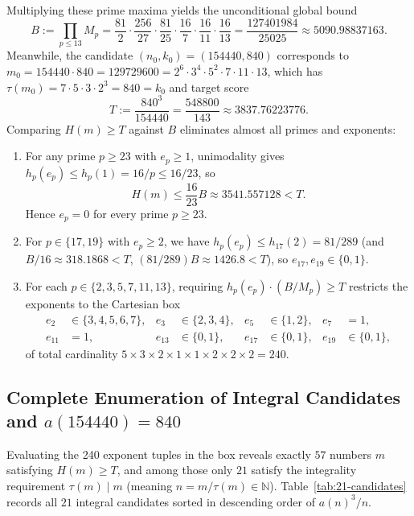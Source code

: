 \documentclass[11pt,a4paper]{article}
\theoremstyle{definition}
\theoremstyle{remark}
\newcommand{\N}{\mathbb{N}}
\begin{document}
Multiplying these prime maxima yields the unconditional global bound
\[
  B := \prod_{p \le 13} M_p = \frac{81}{2}\cdot\frac{256}{27}\cdot\frac{81}{25}\cdot\frac{16}{7}\cdot\frac{16}{11}\cdot\frac{16}{13} = \frac{127401984}{25025} \approx 5090.98837163.
\]
Meanwhile, the candidate $(n_0, k_0) = (154440, 840)$ corresponds to $m_0 = 154440 \cdot 840 = 129729600 = 2^6 \cdot 3^4 \cdot 5^2 \cdot 7 \cdot 11 \cdot 13$, which has $\tau(m_0) = 7\cdot 5\cdot 3\cdot 2^3 = 840 = k_0$ and target score
\[
  T := \frac{840^3}{154440} = \frac{548800}{143} \approx 3837.76223776.
\]
Comparing $H(m) \ge T$ against $B$ eliminates almost all primes and exponents:
\begin{enumerate}
  \item For any prime $p \ge 23$ with $e_p \ge 1$, unimodality gives $h_p(e_p) \le h_p(1) = 16/p \le 16/23$, so
  \[
    H(m) \le \frac{16}{23} B \approx 3541.557128 < T.
  \]
  Hence $e_p = 0$ for every prime $p \ge 23$.
  \item For $p \in \{17, 19\}$ with $e_p \ge 2$, we have $h_p(e_p) \le h_{17}(2) = 81/289$ (and $B/16 \approx 318.1868 < T$, $(81/289)B \approx 1426.8 < T$), so $e_{17}, e_{19} \in \{0, 1\}$.
  \item For each $p \in \{2,3,5,7,11,13\}$, requiring $h_p(e_p) \cdot (B/M_p) \ge T$ restricts the exponents to the Cartesian box
  \begin{align*}
    e_2 &\in \{3,4,5,6,7\}, & e_3 &\in \{2,3,4\}, & e_5 &\in \{1,2\}, & e_7 &= 1, \\
    e_{11} &= 1, & e_{13} &\in \{0,1\}, & e_{17} &\in \{0,1\}, & e_{19} &\in \{0,1\},
  \end{align*}
  of total cardinality $5 \times 3 \times 2 \times 1 \times 1 \times 2 \times 2 \times 2 = 240$.
\end{enumerate}

\subsection{Complete Enumeration of Integral Candidates and \texorpdfstring{$a(154440) = 840$}{a(154440) = 840}}

Evaluating the 240 exponent tuples in the box reveals exactly $57$ numbers $m$ satisfying $H(m) \ge T$, and among those only $21$ satisfy the integrality requirement $\tau(m) \mid m$ (meaning $n = m/\tau(m) \in \N$). Table~\ref{tab:21-candidates} records all $21$ integral candidates sorted in descending order of $a(n)^3/n$.
\end{document}
